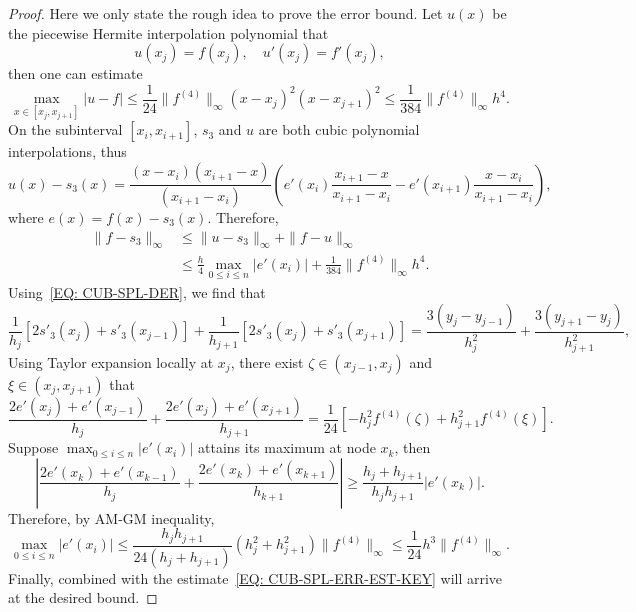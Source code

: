\begin{proof}
    Here we only state the rough idea to prove the error bound. Let $u(x)$ be the piecewise Hermite interpolation polynomial that 
    \begin{equation}
        u(x_j)=f(x_j), \quad u'(x_j) = f'(x_j),
    \end{equation}
    then one can estimate 
    \begin{equation}
        \max_{x\in [x_j, x_{j+1}]} |u-f|\le  \frac{1}{24}\|f^{(4)}\|_{\infty} (x - x_j)^2 (x - x_{j+1})^2 \le \frac{1}{384}\|f^{(4)}\|_{\infty} h^4.
    \end{equation}
    On the subinterval $[x_i, x_{i+1}]$, $s_3$ and $u$ are both cubic polynomial interpolations, thus 
    \begin{equation}
         u(x) - s_3(x) = \frac{(x - x_i)(x_{i+1} - x)}{(x_{i+1} - x_i)} \left( e'(x_i) \frac{x_{i+1} - x}{x_{i+1} - x_i}  - e'(x_{i+1})\frac{x - x_i}{x_{i+1} - x_i}\right), 
    \end{equation}
    where $e(x) = f(x) - s_3(x)$. 
    Therefore, 
    \begin{equation}
    \label{EQ: CUB-SPL-ERR-EST-KEY}
    \begin{aligned}
        \|f - s_3\|_{\infty} &\le  \|u - s_3\|_{\infty}  +  \|f - u\|_{\infty} \\
        &\le \frac{h}{4} \max_{0\le i\le n} |e'(x_i)| + \frac{1}{384}\|f^{(4)}\|_{\infty} h^4. 
    \end{aligned}
    \end{equation}
    Using~\eqref{EQ: CUB-SPL-DER}, we find that
\begin{equation}
    \frac{1}{h_j}\left[ 2 s'_3(x_j) + s'_3(x_{j-1}) \right] + \frac{1}{h_{j+1}}\left[2 s'_3(x_j) + s'_3(x_{j+1})\right] =\frac{3(y_j - y_{j-1})}{h_j^2} + \frac{3(y_{j+1} - y_j)}{h_{j+1}^2}, 
\end{equation}
Using Taylor expansion locally at $x_j$, there exist $\zeta\in (x_{j-1}, x_j)$ and $\xi\in (x_j, x_{j+1})$ that
\begin{equation}
    \frac{2 e'(x_j) + e'(x_{j-1})}{h_j} + \frac{2 e'(x_j) + e'(x_{j+1})}{h_{j+1}}= \frac{1}{24}\left[-h_j^2 f^{(4)}(\zeta)+ h_{j+1}^2 f^{(4)}(\xi)\right].
\end{equation}
Suppose 
$\max_{0 \le i\le n}|e'(x_i)|$ attains its maximum at node $x_{k}$, then 
\begin{equation}
    \left| \frac{2 e'(x_k) + e'(x_{k-1})}{h_j} + \frac{2 e'(x_k) + e'(x_{k+1})}{h_{k+1}} \right| \ge \frac{h_j+h_{j+1}}{h_j h_{j+1}} |e'(x_k)|.
\end{equation}
Therefore, by AM-GM inequality,
\begin{equation}
    \max_{0 \le i\le n}|e'(x_i)| \le \frac{h_{j}h_{j+1}}{24 (h_j + h_{j+1}) } (h_j^2 + h_{j+1}^2) \|f^{(4)}\|_{\infty} \le \frac{1}{24}h^3 \|f^{(4)}\|_{\infty}. 
\end{equation}
Finally, combined with the estimate~\eqref{EQ: CUB-SPL-ERR-EST-KEY} will arrive at the desired bound.
\end{proof}
